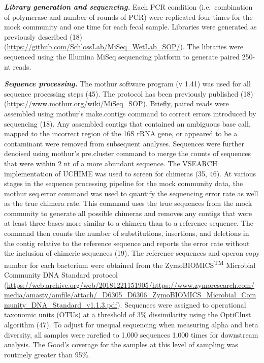 \documentclass[11pt,]{article}
\begin{document}
\textbf{\emph{Library generation and sequencing.}} Each PCR condition
(i.e.~combination of polymerase and number of rounds of PCR) were
replicated four times for the mock community and one time for each fecal
sample. Libraries were generated as previously described (18)
(\url{https://github.com/SchlossLab/MiSeq_WetLab_SOP/}). The libraries
were sequenced using the Illumina MiSeq sequencing platform to generate
paired 250-nt reads.

\textbf{\emph{Sequence processing.}} The mothur software program (v
1.41) was used for all sequence processing steps (45). The protocol has
been previously published (18)
(\url{https://www.mothur.org/wiki/MiSeq_SOP}). Briefly, paired reads
were assembled using mothur's make.contigs command to correct errors
introduced by sequencing (18). Any assembled contigs that contained an
ambiguous base call, mapped to the incorrect region of the 16S rRNA
gene, or appeared to be a contaminant were removed from subsequent
analyses. Sequences were further denoised using mothur's pre.cluster
command to merge the counts of sequences that were within 2 nt of a more
abundant sequence. The VSEARCH implementation of UCHIME was used to
screen for chimeras (35, 46). At various stages in the sequence
processing pipeline for the mock community data, the mothur seq.error
command was used to quantify the sequencing error rate as well as the
true chimera rate. This command uses the true sequences from the mock
community to generate all possible chimeras and removes any contigs that
were at least three bases more similar to a chimera than to a reference
sequence. The command then counts the number of substitutions,
insertions, and deletions in the contig relative to the reference
sequence and reports the error rate without the inclusion of chimeric
sequences (19). The reference sequences and operon copy number for each
bacterium were obtained from the ZymoBIOMICS\textsuperscript{TM}
Microbial Community DNA Standard protocol
(\url{https://web.archive.org/web/20181221151905/https://www.zymoresearch.com/media/amasty/amfile/attach/_D6305_D6306_ZymoBIOMICS_Microbial_Community_DNA_Standard_v1.1.3.pdf}).
Sequences were assigned to operational taxonomic units (OTUs) at a
threshold of 3\% dissimilarity using the OptiClust algorithm (47). To
adjust for unequal sequencing when measuring alpha and beta diversity,
all samples were rarefied to 1,000 sequences 1,000 times for downstream
analysis. The Good's coverage for the samples at this level of sampling
was routinely greater than 95\%.
\end{document}
